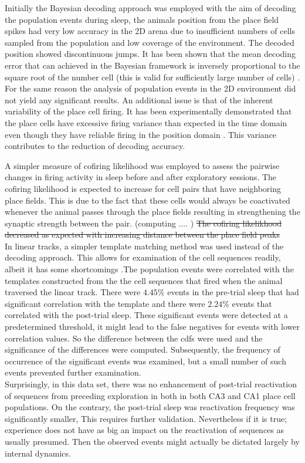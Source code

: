Initially the Bayesian decoding approach was employed with the aim of decoding the population events during sleep, the animals position from the place field spikes had very low accuracy in the 2D arena due to insufficient numbers of cells sampled from the population and low coverage of the environment. The decoded position showed discontinuous jumps. It has been shown that the mean decoding error that can achieved in the Bayesian framework is inversely proportional to the square root of the number cell (this is valid for sufficiently large number of cells) \cite{Zhang2013}. For the same reason the analysis of population events in the 2D environment did not yield any significant results. An additional issue is that of the inherent variability of the place cell firing. It has been experimentally demonstrated that the place cells have excessive firing variance than expected in the time domain even though they have reliable firing in the position domain \cite{Fenton1998}. This variance contributes to the reduction of decoding accuracy.  

A simpler measure of cofiring likelihood was employed to assess the pairwise changes in firing activity in sleep before and after exploratory sessions. The cofiring likelihood is expected to increase for cell pairs that have neighboring place fields. This is due to the fact that these cells would always be coactivated whenever the animal passes through the place fields resulting in strengthening the synaptic strength between the pair. (computing .... ) 
\st{The cofiring likelikhood decreased as expected with increasing distance between the place field peaks }\\

In linear tracks, a simpler template matching method was used instead of the decoding approach. This allows for examination of the cell sequences readily, albeit it has some shortcomings \cite{Tatsuno2006}.The population events were correlated with the templates constructed from the the cell sequences that fired when the animal traversed the linear track. There were $4.45 \% $ events in the pre-trial sleep that had significant correlation with the template and there were $ 2.24 \% $  events that correlated with the post-trial sleep. These significant events were detected at a predetermined threshold, it might lead to the false negatives for events with lower correlation values. So the difference between the cdfs were used and the significance of the differences were computed. Subsequently, the frequency of occurrence of the significant events was examined, but a small number of such events prevented further examination.\\ Surprisingly, in this data set, there was no enhancement of post-trial reactivation of sequences from preceding exploration in both in both CA3 and CA1 place cell populations. On the contrary, the post-trial sleep was reactivation frequency was significantly smaller, This requires further validation. Nevertheless if it is true; experience does not have as big an impact on the reactivation of sequences as usually presumed. Then the observed events might actually be dictated largely by internal dynamics. 

